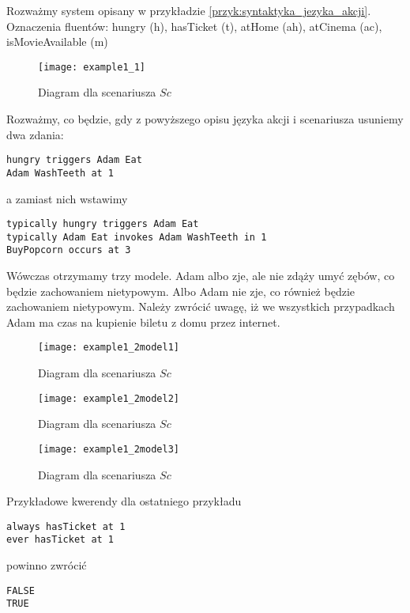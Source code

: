 \begin{example}
Rozważmy system opisany w przykładzie \ref{przyk:syntaktyka_jezyka_akcji}.
Oznaczenia fluentów: hungry (h), hasTicket (t), atHome (ah), atCinema (ac), isMovieAvailable (m)

\begin{figure}[h!]
	\centering
	\texttt{[image: example1\_1]}
	\caption{Diagram dla scenariusza $Sc$}
	\label{PicSC1}
\end{figure}

Rozważmy, co będzie, gdy z powyższego opisu języka akcji i scenariusza usuniemy dwa zdania:

	\begin{lstlisting}
hungry triggers Adam Eat
Adam WashTeeth at 1
	\end{lstlisting}

a zamiast nich wstawimy

	\begin{lstlisting}
typically hungry triggers Adam Eat
typically Adam Eat invokes Adam WashTeeth in 1 
BuyPopcorn occurs at 3
	\end{lstlisting}
	
Wówczas otrzymamy trzy modele. 
Adam albo zje, ale nie zdąży umyć zębów, co będzie zachowaniem nietypowym. 
Albo Adam nie zje, co również będzie zachowaniem nietypowym. 
Należy zwrócić uwagę, iż we wszystkich przypadkach Adam ma czas na kupienie biletu z domu przez internet. 

\begin{figure}[h!]
	\centering
	\texttt{[image: example1\_2model1]}
	\caption{Diagram dla scenariusza $Sc$}
	\label{PicSC2}
\end{figure}

\begin{figure}[h!]
	\centering
	\texttt{[image: example1\_2model2]}
	\caption{Diagram dla scenariusza $Sc$}
	\label{PicSC3}
\end{figure}

\begin{figure}[h!]
	\centering
	\texttt{[image: example1\_2model3]}
	\caption{Diagram dla scenariusza $Sc$}
	\label{PicSC4}
\end{figure}

Przykładowe kwerendy dla ostatniego przykładu

	\begin{lstlisting}
always hasTicket at 1
ever hasTicket at 1
	\end{lstlisting}	
powinno zwrócić
	\begin{lstlisting}
FALSE
TRUE
	\end{lstlisting}		
\end{example}	

